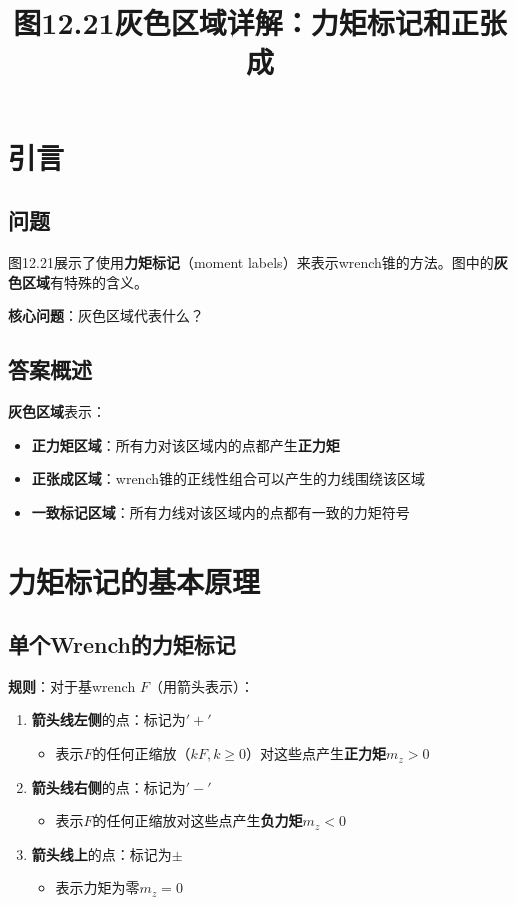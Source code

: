 \documentclass[12pt,a4paper]{article}
\title{图12.21灰色区域详解：力矩标记和正张成}
\author{}
\date{}
\begin{document}
\maketitle

\section{引言}

\subsection{问题}

图12.21展示了使用\textbf{力矩标记}（moment labels）来表示wrench锥的方法。图中的\textbf{灰色区域}有特殊的含义。

\textbf{核心问题}：灰色区域代表什么？

\subsection{答案概述}

\textbf{灰色区域}表示：
\begin{itemize}
\item \textbf{正力矩区域}：所有力对该区域内的点都产生\textbf{正力矩}
\item \textbf{正张成区域}：wrench锥的正线性组合可以产生的力线围绕该区域
\item \textbf{一致标记区域}：所有力线对该区域内的点都有一致的力矩符号
\end{itemize}

\section{力矩标记的基本原理}

\subsection{单个Wrench的力矩标记}

\textbf{规则}：对于基wrench $F$（用箭头表示）：
\begin{enumerate}
\item \textbf{箭头线左侧}的点：标记为$'+'$
   \begin{itemize}
   \item 表示$F$的任何正缩放（$kF, k \geq 0$）对这些点产生\textbf{正力矩}$m_z > 0$
   \end{itemize}

\item \textbf{箭头线右侧}的点：标记为$'-'$
   \begin{itemize}
   \item 表示$F$的任何正缩放对这些点产生\textbf{负力矩}$m_z < 0$
   \end{itemize}

\item \textbf{箭头线上}的点：标记为$\pm$
   \begin{itemize}
   \item 表示力矩为零$m_z = 0$
   \end{itemize}
\end{enumerate}
\end{document}
